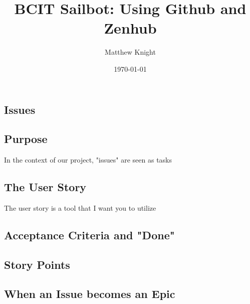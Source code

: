\documentclass{article}
\title{BCIT Sailbot: Using Github and Zenhub}
\author{Matthew Knight}
\date{\today}
\begin{document}
\maketitle

\newpage

\begin{multicols}{2}

\section*{Issues}

\subsection*{Purpose}

In the context of our project, "issues" are seen as tasks

\subsection*{The User Story}

The user story is a tool that I want you to utilize 

\subsection*{Acceptance Criteria and "Done"}



\subsection*{Story Points}



\subsection*{When an Issue becomes an Epic}



\end{multicols}
\end{document}
